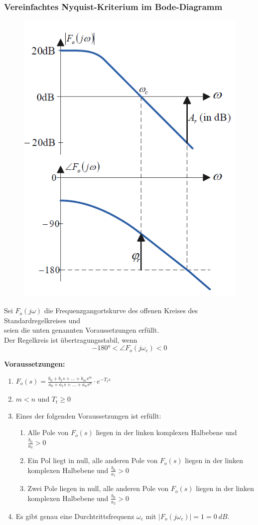 \documentclass[10pt,a4paper]{article}
\begin{document}
\subsubsection{Vereinfachtes Nyquist-Kriterium im Bode-Diagramm}
\begin{figure}[H]
	\includegraphics[width = 0.4\columnwidth]{imgs/nyquist_bode.png}
\end{figure}
Sei $F_o(j \omega)$ die Frequenzgangortskurve des offenen Kreises des Standardregelkreises und \\
seien die unten genannten Voraussetzungen erfüllt. \\
Der Regelkreis ist übertragungsstabil, wenn
$$
	-180° < \angle F_o(j \omega_c) < 0
$$

\textbf{Voraussetzungen:}
\begin{enumerate}
	\item $F_o(s) = \frac{b_0 + b_1s + \dots + b_ms^m}{a_0 + a_1s + \dots + a_ns^n} ⋅ e^{-T_ts}$
	\item $m < n$ und $T_t ≥ 0$
	\item Eines der folgenden Voraussetzungen ist erfüllt:
	\begin{enumerate}
		\item Alle Pole von $F_o(s)$ liegen in der linken komplexen Halbebene und $\frac{b_0}{a_0} > 0$
		\item Ein Pol liegt in null, alle anderen Pole von $F_o(s)$ liegen in der linken komplexen Halbebene und $\frac{b_0}{a_1} > 0$
		\item Zwei Pole liegen in null, alle anderen Pole von $F_o(s)$ liegen in der linken komplexen Halbebene und $\frac{b_0}{a_2} > 0$
	\end{enumerate}
	\item Es gibt genau eine Durchtrittsfrequenz $\omega_c$ mit $|F_o(j \omega_c)| = 1 = 0 ~dB$. \\
\end{enumerate}
\end{document}
